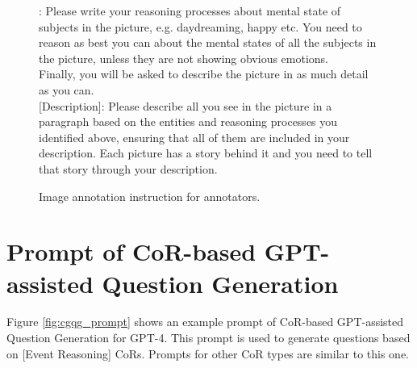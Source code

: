 \begin{figure*}
\begin{tcolorbox}
      : Please write your reasoning processes about mental state of subjects in the picture, e.g. daydreaming, happy etc. You need to reason as best you can about the mental states of all the subjects in the picture, unless they are not showing obvious emotions. \\
  
      Finally, you will be asked to describe the picture in as much detail as you can.\\
  
      [Description]: Please describe all you see in the picture in a paragraph based on the entities and reasoning processes you identified above, ensuring that all of them are included in your description. Each picture has a story behind it and you need to tell that story through your description. \\
    \end{tcolorbox}
    \caption{Image annotation instruction for annotators.}
    \label{fig:annotation}
\end{figure*}

\section{Prompt of CoR-based GPT-assisted Question Generation}
\label{sec:qa_prompt}

Figure \ref{fig:cgqg_prompt} shows an example prompt of CoR-based GPT-assisted Question Generation for GPT-4. 
This prompt is used to generate questions based on [Event Reasoning] CoRs. 
Prompts for other CoR types are similar to this one.

